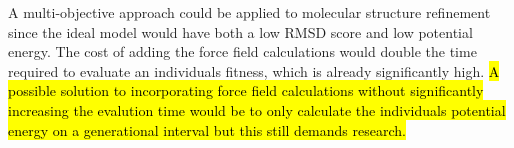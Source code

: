 \documentclass[conference]{IEEEtran}
\begin{document}
A multi-objective approach could be applied to molecular structure refinement since the ideal model would have both a low RMSD score and low potential energy. The cost of adding the force field calculations would double the time required to evaluate an individuals fitness, which is already significantly high. \hl{A possible solution to incorporating force field calculations without significantly increasing the evalution time would be to only calculate the individuals potential energy on a generational interval but this still demands research.}



\end{document}
